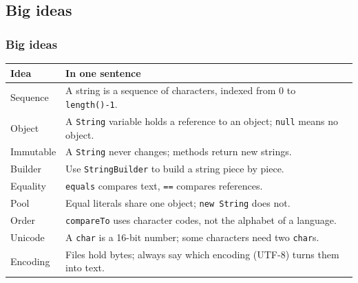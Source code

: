 \documentclass[aspectratio=169,10pt,compress]{beamer}
\begin{document}

\subsection[Ideas]{Big ideas}




\begin{frame}[t,fragile] \frametitle{Big ideas}
  \small
  \begin{tabular}{@{}L{0.25\textwidth}L{0.68\textwidth}@{}}
    \toprule
    \textbf{Idea} & \textbf{In one sentence} \\
    \midrule
    Sequence         & A string is a sequence of characters, indexed from 0 to \texttt{length()-1}. \\
    Object           & A \texttt{String} variable holds a reference to an object; \texttt{null} means no object. \\
    Immutable        & A \texttt{String} never changes; methods return new strings. \\
    Builder          & Use \texttt{StringBuilder} to build a string piece by piece. \\
    Equality         & \texttt{equals} compares text, \texttt{==} compares references. \\
    Pool             & Equal literals share one object; \texttt{new String} does not. \\
    Order            & \texttt{compareTo} uses character codes, not the alphabet of a language. \\
    Unicode          & A \texttt{char} is a 16-bit number; some characters need two \texttt{char}s. \\
    Encoding         & Files hold bytes; always say which encoding (UTF-8) turns them into text. \\
    \bottomrule
  \end{tabular}
\end{frame}
\end{document}
